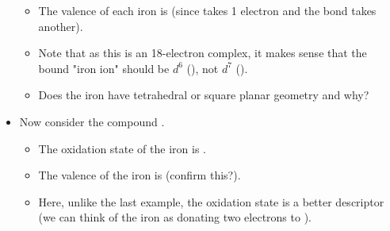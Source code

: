 \documentclass[../notes.tex]{subfiles}
\begin{document}
\begin{itemize}
\begin{itemize}
        \item The valence of each iron is  (since  takes 1 electron and the  bond takes another).
        \item Note that as this is an 18-electron complex, it makes sense that the bound "iron ion" should be $d^6$ (), not $d^7$ ().
        \item Does the iron have tetrahedral or square planar geometry and why?
    \end{itemize}
    \item Now consider the compound .
    \begin{itemize}
        \item The oxidation state of the iron is .
        \item The valence of the iron is  (confirm this?).
        \item Here, unlike the last example, the oxidation state is a better descriptor (we can think of the iron as donating two electrons to ).
    \end{itemize}
\end{itemize}
\end{document}
